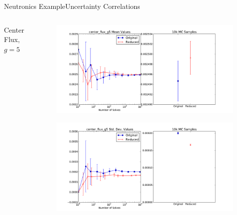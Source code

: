 \documentclass{beamer}
\begin{document}
\begin{frame}{Neutronics Example}{Uncertainty Correlations}\vspace{-20pt}
  \begin{columns}
    \begin{column}{0.3\textwidth}
      \centering
      \vfill
      Center Flux, $g=5$
      \vfill
    \end{column}
    \begin{column}{0.7\textwidth}
      \begin{figure}
        \centering
        \includegraphics[width=\linewidth]{c5g7/C5G7_center_flux_g5_mean_reduction}
      \end{figure}
      \vspace{-30pt}
      \begin{figure}
        \centering
        \includegraphics[width=\linewidth]{c5g7/C5G7_center_flux_g5_stddev_reduction}
      \end{figure}
    \end{column}
  \end{columns}
\end{frame}
\end{document}
